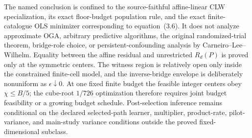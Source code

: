 The named conclusion is confined to the source-faithful affine-linear CLW specialization, its exact floor-budget population rule, and the exact finite-catalogue OLS minimizer corresponding to equation~(3.6).  It does not analyze approximate OGA, arbitrary predictive algorithms, the original randomized-trial theorem, bridge-role choice, or persistent-confounding analysis by Carneiro--Lee--Wilhelm.  Equality between the affine residual and unrestricted \(R_d(P)\) is proved only at the symmetric centers.  The witness region is relatively open only inside the constrained finite-cell model, and the inverse-bridge envelope is deliberately nonuniform as \(\epsilon\downarrow0\).  At one fixed finite budget the feasible integer centers obey \(\chi\le B/5\); the cube-root \(1/726\) optimization therefore requires joint budget feasibility or a growing budget schedule.  Post-selection inference remains conditional on the declared selected-path learner, multiplier, product-rate, pilot-variance, and main-study variance conditions outside the proved fixed-dimensional subclass.